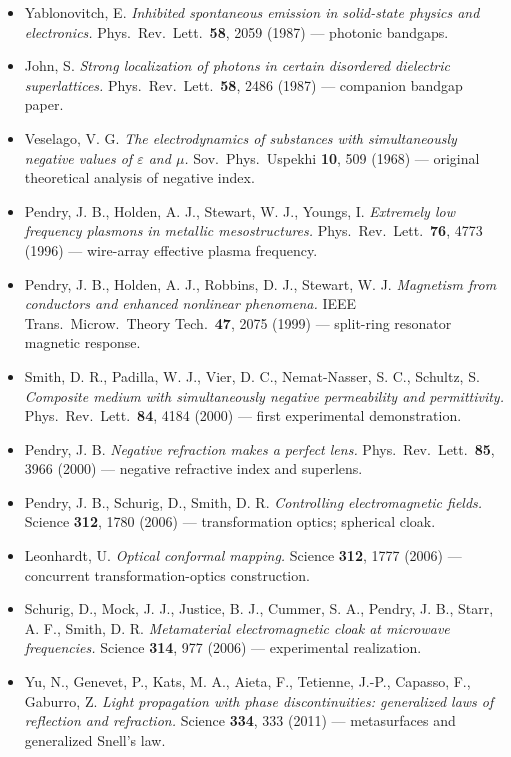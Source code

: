 \documentclass[11pt,a4paper]{article}
\begin{document}
\begin{itemize}[noitemsep]
\item Yablonovitch, E. \textit{Inhibited spontaneous emission in solid-state physics and electronics.} Phys.\ Rev.\ Lett.\ \textbf{58}, 2059 (1987) --- photonic bandgaps.
\item John, S. \textit{Strong localization of photons in certain disordered dielectric superlattices.} Phys.\ Rev.\ Lett.\ \textbf{58}, 2486 (1987) --- companion bandgap paper.
\item Veselago, V. G. \textit{The electrodynamics of substances with simultaneously negative values of $\varepsilon$ and $\mu$.} Sov.\ Phys.\ Uspekhi \textbf{10}, 509 (1968) --- original theoretical analysis of negative index.
\item Pendry, J. B., Holden, A. J., Stewart, W. J., Youngs, I. \textit{Extremely low frequency plasmons in metallic mesostructures.} Phys.\ Rev.\ Lett.\ \textbf{76}, 4773 (1996) --- wire-array effective plasma frequency.
\item Pendry, J. B., Holden, A. J., Robbins, D. J., Stewart, W. J. \textit{Magnetism from conductors and enhanced nonlinear phenomena.} IEEE Trans.\ Microw.\ Theory Tech.\ \textbf{47}, 2075 (1999) --- split-ring resonator magnetic response.
\item Smith, D. R., Padilla, W. J., Vier, D. C., Nemat-Nasser, S. C., Schultz, S. \textit{Composite medium with simultaneously negative permeability and permittivity.} Phys.\ Rev.\ Lett.\ \textbf{84}, 4184 (2000) --- first experimental demonstration.
\item Pendry, J. B. \textit{Negative refraction makes a perfect lens.} Phys.\ Rev.\ Lett.\ \textbf{85}, 3966 (2000) --- negative refractive index and superlens.
\item Pendry, J. B., Schurig, D., Smith, D. R. \textit{Controlling electromagnetic fields.} Science \textbf{312}, 1780 (2006) --- transformation optics; spherical cloak.
\item Leonhardt, U. \textit{Optical conformal mapping.} Science \textbf{312}, 1777 (2006) --- concurrent transformation-optics construction.
\item Schurig, D., Mock, J. J., Justice, B. J., Cummer, S. A., Pendry, J. B., Starr, A. F., Smith, D. R. \textit{Metamaterial electromagnetic cloak at microwave frequencies.} Science \textbf{314}, 977 (2006) --- experimental realization.
\item Yu, N., Genevet, P., Kats, M. A., Aieta, F., Tetienne, J.-P., Capasso, F., Gaburro, Z. \textit{Light propagation with phase discontinuities: generalized laws of reflection and refraction.} Science \textbf{334}, 333 (2011) --- metasurfaces and generalized Snell's law.

\end{itemize}
\end{document}
